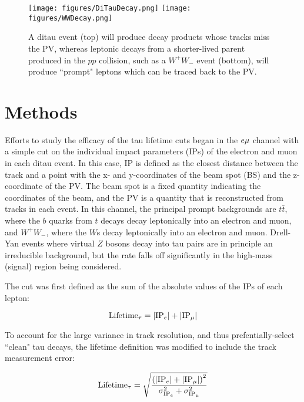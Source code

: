 \begin{figure}[tbh!]
\centering
\texttt{[image: figures/DiTauDecay.png]}
\texttt{[image: figures/WWDecay.png]}
\caption{A ditau event (top) will produce decay products whose tracks miss the PV, whereas leptonic decays from a shorter-lived parent produced in the $pp$ collision, such as a $W^+W_-$ event (bottom), will produce ``prompt" leptons which can be traced back to the PV.}
\label{fig:PromptVsTauDecay}
\end{figure}

\section{Methods}

Efforts to study the efficacy of the tau lifetime cuts began in the $e\mu$ channel with a simple cut on the individual impact parameters (IPs) of the electron and muon in each ditau event. In this case, IP is defined as the closest distance between the track and a point with the x- and y-coordinates of the beam spot (BS) and the z-coordinate of the PV. The beam spot is a fixed quantity indicating the coordinates of the beam, and the PV is a quantity that is reconstructed from tracks in each event. In this channel, the principal prompt backgrounds are $t\bar{t}$, where the $b$ quarks from $t$ decays decay leptonically into an electron and muon, and $W^+W_-$, where the $W$s decay leptonically into an electron and muon. Drell-Yan events where virtual $Z$ bosons decay into tau pairs are in principle an irreducible background, but the rate falls off significantly in the high-mass (signal) region being considered.

The cut was first defined as the sum of the absolute values of the IPs of each lepton:

\begin{equation}
\centering
\textrm{Lifetime}_\tau = |\textrm{IP}_e| + |\textrm{IP}_\mu|
\end{equation}

\noindent To account for the large variance in track resolution, and thus prefentially-select ``clean" tau decays, the lifetime definition was modified to include the track measurement error:

\begin{equation}
\centering
\textrm{Lifetime}_\tau = \sqrt{\frac{\left(|\textrm{IP}_e| + |\textrm{IP}_\mu|\right)^2}{\sigma_{\textrm{IP}_e}^2 + \sigma_{\textrm{IP}_\mu}^2}}
\label{eq:IP}
\end{equation}

